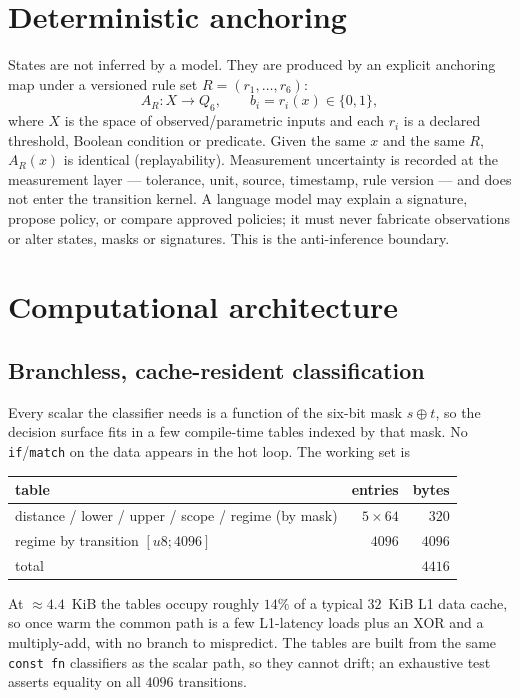 \documentclass[11pt,a4paper]{article}
\begin{document}
\section{Deterministic anchoring}
States are not inferred by a model. They are produced by an explicit anchoring map
under a versioned rule set $R=(r_1,\dots,r_6)$:
\begin{equation}
A_R : X \to Q_6, \qquad b_i = r_i(x)\in\{0,1\},
\end{equation}
where $X$ is the space of observed/parametric inputs and each $r_i$ is a declared
threshold, Boolean condition or predicate. Given the same $x$ and the same $R$,
$A_R(x)$ is identical (replayability). Measurement uncertainty is recorded at the
measurement layer --- tolerance, unit, source, timestamp, rule version --- and does
not enter the transition kernel. A language model may explain a signature, propose
policy, or compare approved policies; it must never fabricate observations or alter
states, masks or signatures. This is the anti-inference boundary.

\section{Computational architecture}
\subsection{Branchless, cache-resident classification}
Every scalar the classifier needs is a function of the six-bit mask $s\oplus t$,
so the decision surface fits in a few compile-time tables indexed by that mask. No
\texttt{if}/\texttt{match} on the data appears in the hot loop. The working set is
\begin{center}
\begin{tabular}{lrr}
\toprule
table & entries & bytes \\
\midrule
distance / lower / upper / scope / regime (by mask) & $5\times 64$ & $320$ \\
regime by transition $[u8;4096]$ & $4096$ & $4096$ \\
\midrule
total & & $4416$ \\
\bottomrule
\end{tabular}
\end{center}
At $\approx 4.4$~KiB the tables occupy roughly $14\%$ of a typical $32$~KiB L1 data
cache, so once warm the common path is a few L1-latency loads plus an XOR and a
multiply-add, with no branch to mispredict. The tables are built from the same
\texttt{const fn} classifiers as the scalar path, so they cannot drift; an
exhaustive test asserts equality on all $4096$ transitions.
\end{document}
